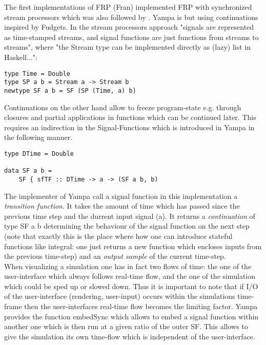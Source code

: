 \documentclass{article}
\begin{document}
The first implementations of FRP (Fran) implemented FRP with synchronized stream processors which was also followed by \cite{Wan2000}. Yampa is but using continuations inspired by Fudgets. In the stream processors approach "signals are represented as time-stamped streams, and signal functions are just functions from streams to streams", where "the Stream type can be implemented directly as (lazy) list in Haskell...":
\begin{lstlisting}[frame=single]
type Time = Double
type SP a b = Stream a -> Stream b
newtype SF a b = SF (SP (Time, a) b)
\end{lstlisting}
Continuations on the other hand allow to freeze program-state e.g. through closures and partial applications in functions which can be continued later. This requires an indirection in the Signal-Functions which is introduced in Yampa in the following manner. 
\begin{lstlisting}[frame=single]
type DTime = Double

data SF a b = 
	SF { sfTF :: DTime -> a -> (SF a b, b)
\end{lstlisting}
The implementer of Yampa call a signal function in this implementation a \textit{transition function}. It takes the amount of time which has passed since the previous time step and the durrent input signal (a). It returns a \textit{continuation} of type SF a b determining the behaviour of the signal function on the next step (note that exactly this is the place where how one can introduce stateful functions like integral: one just returns a new function which encloses inputs from the previous time-step) and an \textit{output sample} of the current time-step. \\

When visualizing a simulation one has in fact two flows of time: the one of the user-interface which always follows real-time flow, and the one of the simulation which could be sped up or slowed down. Thus it is important to note that if I/O of the user-interface (rendering, user-input) occurs within the simulations time-frame then the user-interfaces real-time flow becomes the limiting factor. Yampa provides the function embedSync which allows to embed a signal function within another one which is then run at a given ratio of the outer SF. This allows to give the simulation its own time-flow which is independent of the user-interface. \\
\end{document}
